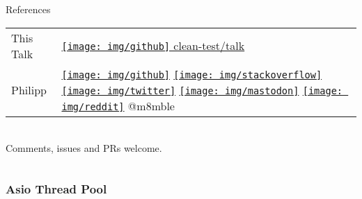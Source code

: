 \documentclass[10pt,aspectratio=169,utf8]{beamer}
\begin{document}
\begin{frame}
\begin{columns}[onlytextwidth]
\begin{column}{.48\textwidth}
\begin{block}{References}
{\begin{tabular}{ @{}l l@{} }
            This Talk&
            \href{%
              https://github.com/clean-test/talk/tree/main/2022-meeting-cpp
            }{%
              \texttt{[image: img/github]} clean-test/talk
            } \\

            Philipp &
            \href{https://github.com/m8mble/}{\texttt{[image: img/github]}}
            \href{https://stackoverflow.com/users/2747160/m8mble}{\texttt{[image: img/stackoverflow]}}
            \href{https://twitter.com/m8mble}{\texttt{[image: img/twitter]}}
            \href{https://mastodon.social/@m8mble}{\texttt{[image: img/mastodon]}}
            \href{https://www.reddit.com/user/m8mble}{\texttt{[image: img/reddit]}}
            @m8mble
          \end{tabular}\\

          Comments, issues and PRs welcome.
        }
      \end{block}
    \end{column}
  \end{columns}
\end{frame}


\appendix

\begin{frame}
  \frametitle{Asio Thread Pool}

  \vspace{-4pt}
  \begin{columns}[T]
    \begin{column}{.5\textwidth}
    \end{column}

    \begin{column}{.5\textwidth}

      \vspace{10pt}
    \end{column}
  \end{columns}
\end{frame}
\end{document}

